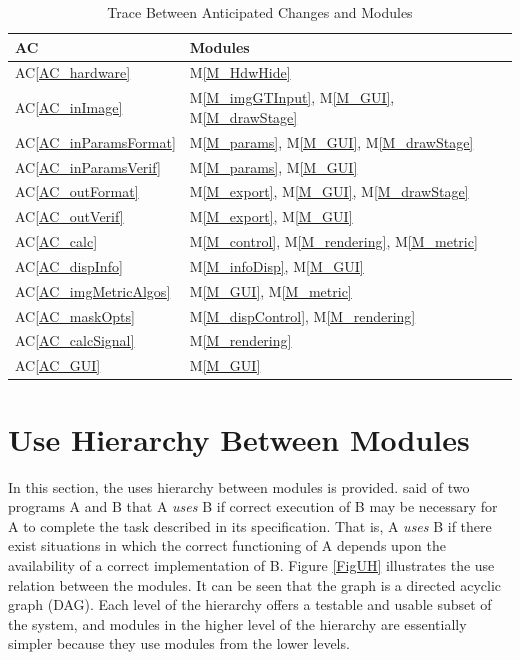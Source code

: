 \documentclass[12pt, titlepage]{article}
\newcommand{\acref}[1]{AC\ref{#1}}
\newcommand{\mref}[1]{M\ref{#1}}
\begin{document}
\begin{table}[H]
\centering
\begin{tabular}{p{} p{}}
\toprule
\textbf{AC} & \textbf{Modules}\\
\midrule
\acref{AC_hardware} & \mref{M_HdwHide}\\
\acref{AC_inImage} & \mref{M_imgGTInput}, \mref{M_GUI}, \mref{M_drawStage}\\
\acref{AC_inParamsFormat} & \mref{M_params}, \mref{M_GUI}, \mref{M_drawStage}\\
\acref{AC_inParamsVerif} & \mref{M_params}, \mref{M_GUI}\\
\acref{AC_outFormat} & \mref{M_export}, \mref{M_GUI}, \mref{M_drawStage}\\
\acref{AC_outVerif} & \mref{M_export}, \mref{M_GUI}\\
\acref{AC_calc} & \mref{M_control}, \mref{M_rendering}, \mref{M_metric}\\
\acref{AC_dispInfo} & \mref{M_infoDisp}, \mref{M_GUI}\\
\acref{AC_imgMetricAlgos} & \mref{M_GUI}, \mref{M_metric}\\
\acref{AC_maskOpts} & \mref{M_dispControl}, \mref{M_rendering}\\
\acref{AC_calcSignal} & \mref{M_rendering}\\
\acref{AC_GUI} & \mref{M_GUI}\\
\bottomrule
\end{tabular}
\caption{Trace Between Anticipated Changes and Modules}
\label{TblACT}
\end{table}

\section{Use Hierarchy Between Modules} \label{SecUse}

In this section, the uses hierarchy between modules is
provided. \citet{Parnas1978} said of two programs A and B that A {\em uses} B if
correct execution of B may be necessary for A to complete the task described in
its specification. That is, A {\em uses} B if there exist situations in which
the correct functioning of A depends upon the availability of a correct
implementation of B.  Figure \ref{FigUH} illustrates the use relation between
the modules. It can be seen that the graph is a directed acyclic graph
(DAG). Each level of the hierarchy offers a testable and usable subset of the
system, and modules in the higher level of the hierarchy are essentially simpler
because they use modules from the lower levels.
\end{document}
